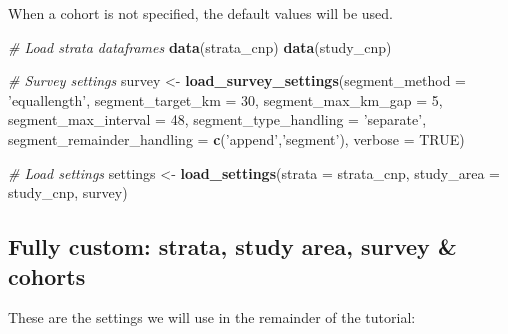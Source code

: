 \documentclass[
]{book}
\newenvironment{Shaded}{\begin{snugshade}}{\end{snugshade}}
\newcommand{\CommentTok}[1]{\textcolor[rgb]{0.56,0.35,0.01}{\textit{#1}}}
\newcommand{\DataTypeTok}[1]{\textcolor[rgb]{0.13,0.29,0.53}{#1}}
\newcommand{\DecValTok}[1]{\textcolor[rgb]{0.00,0.00,0.81}{#1}}
\newcommand{\KeywordTok}[1]{\textcolor[rgb]{0.13,0.29,0.53}{\textbf{#1}}}
\newcommand{\NormalTok}[1]{#1}
\newcommand{\OtherTok}[1]{\textcolor[rgb]{0.56,0.35,0.01}{#1}}
\newcommand{\StringTok}[1]{\textcolor[rgb]{0.31,0.60,0.02}{#1}}
\begin{document}
When a cohort is not specified, the default values will be used.

\begin{Shaded}
\begin{Highlighting}[]
\CommentTok{# Load strata dataframes}
\KeywordTok{data}\NormalTok{(strata_cnp)}
\KeywordTok{data}\NormalTok{(study_cnp)}

\CommentTok{# Survey settings}
\NormalTok{survey <-}\StringTok{ }
\StringTok{  }\KeywordTok{load_survey_settings}\NormalTok{(}\DataTypeTok{segment_method =} \StringTok{'equallength'}\NormalTok{,}
                       \DataTypeTok{segment_target_km =} \DecValTok{30}\NormalTok{,}
                       \DataTypeTok{segment_max_km_gap =} \DecValTok{5}\NormalTok{,}
                       \DataTypeTok{segment_max_interval =} \DecValTok{48}\NormalTok{,}
                       \DataTypeTok{segment_type_handling =} \StringTok{'separate'}\NormalTok{,}
                       \DataTypeTok{segment_remainder_handling =} \KeywordTok{c}\NormalTok{(}\StringTok{'append'}\NormalTok{,}\StringTok{'segment'}\NormalTok{),}
                       \DataTypeTok{verbose =} \OtherTok{TRUE}\NormalTok{)}

\CommentTok{# Load settings}
\NormalTok{settings <-}\StringTok{ }\KeywordTok{load_settings}\NormalTok{(}\DataTypeTok{strata =}\NormalTok{ strata_cnp,}
                          \DataTypeTok{study_area =}\NormalTok{ study_cnp,}
\NormalTok{                          survey)}
\end{Highlighting}
\end{Shaded}

\hypertarget{fully-custom-strata-study-area-survey-cohorts}{%
\subsection*{Fully custom: strata, study area, survey \& cohorts}\label{fully-custom-strata-study-area-survey-cohorts}}

These are the settings we will use in the remainder of the tutorial:
\end{document}
